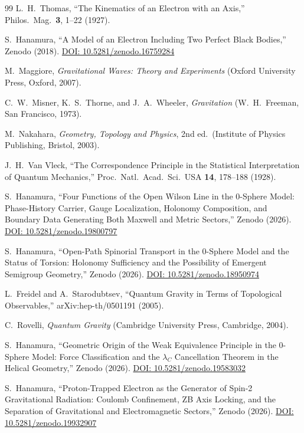 \documentclass[%
 reprint, amsmath,amssymb, aps, prd, ]{revtex4-2}
\numberwithin{equation}{section}
\begin{document}
\begin{thebibliography}{99}
L.~H.~Thomas, ``The Kinematics of an Electron with an Axis,'' Philos.\ Mag.\ \textbf{3}, 1--22 (1927).

S.~Hanamura, ``A Model of an Electron Including Two Perfect Black Bodies,'' Zenodo (2018). \href{https://doi.org/10.5281/zenodo.16759284}{DOI: 10.5281/zenodo.16759284}

M.~Maggiore, \textit{Gravitational Waves: Theory and Experiments} (Oxford University Press, Oxford, 2007).

C.~W.~Misner, K.~S.~Thorne, and J.~A.~Wheeler, \textit{Gravitation} (W.~H.~Freeman, San Francisco, 1973).

M.~Nakahara, \textit{Geometry, Topology and Physics}, 2nd ed.\ (Institute of Physics Publishing, Bristol, 2003).

J.~H.~Van Vleck, ``The Correspondence Principle in the Statistical Interpretation of Quantum Mechanics,'' Proc.\ Natl.\ Acad.\ Sci.\ USA \textbf{14}, 178--188 (1928).

S.~Hanamura, ``Four Functions of the Open Wilson Line in the 0-Sphere Model: Phase-History Carrier, Gauge Localization, Holonomy Composition, and Boundary Data Generating Both Maxwell and Metric Sectors,'' Zenodo (2026). \href{https://doi.org/10.5281/zenodo.19800797}{DOI: 10.5281/zenodo.19800797}

S.~Hanamura, ``Open-Path Spinorial Transport in the 0-Sphere Model and the Status of Torsion: Holonomy Sufficiency and the Possibility of Emergent Semigroup Geometry,'' Zenodo (2026). \href{https://doi.org/10.5281/zenodo.18950974}{DOI: 10.5281/zenodo.18950974}

L.~Freidel and A.~Starodubtsev, ``Quantum Gravity in Terms of Topological Observables,'' arXiv:hep-th/0501191 (2005).

C.~Rovelli, \textit{Quantum Gravity} (Cambridge University Press, Cambridge, 2004).

S.~Hanamura, ``Geometric Origin of the Weak Equivalence Principle in the 0-Sphere Model: Force Classification and the $\lambda_C$ Cancellation Theorem in the Helical Geometry,'' Zenodo (2026). \href{https://doi.org/10.5281/zenodo.19583032}{DOI: 10.5281/zenodo.19583032}

S.~Hanamura, ``Proton-Trapped Electron as the Generator of Spin-2 Gravitational Radiation: Coulomb Confinement, ZB Axis Locking, and the Separation of Gravitational and Electromagnetic Sectors,'' Zenodo (2026). \href{https://doi.org/10.5281/zenodo.19932907}{DOI: 10.5281/zenodo.19932907}


\end{thebibliography}
\end{document}
